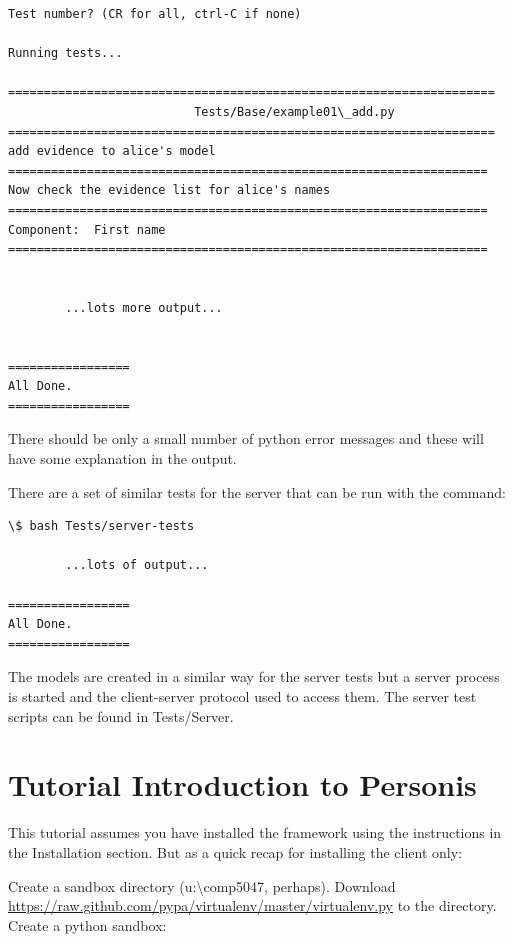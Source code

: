 \documentclass[letterpaper,10pt,english]{sphinxmanual}
\begin{document}
\begin{Verbatim}[commandchars=\\\{\}]
Test number? (CR for all, ctrl-C if none)

Running tests...

====================================================================
                          Tests/Base/example01\_add.py
====================================================================
add evidence to alice's model
===================================================================
Now check the evidence list for alice's names
===================================================================
Component:  First name
===================================================================


        ...lots more output...


=================
All Done.
=================
\end{Verbatim}

There should be only a small number of python error messages and these will have some explanation in the output.

There are a set of similar tests for the server that can be run with the command:

\begin{Verbatim}[commandchars=\\\{\}]
\$ bash Tests/server-tests

        ...lots of output...

=================
All Done.
=================
\end{Verbatim}

The models are created in a similar way for the server tests but a server process is started and the
client-server protocol used to access them. The server test scripts can be found in Tests/Server.


\chapter{Tutorial Introduction to Personis}
\label{Tutorial::doc}\label{Tutorial:tutorial-introduction-to-personis}
This tutorial assumes you have installed the framework using the instructions in the Installation section.
But as a quick recap for installing the client only:

Create a sandbox directory (u:\textbackslash{}comp5047, perhaps). Download \href{https://raw.github.com/pypa/virtualenv/master/virtualenv.py}{https://raw.github.com/pypa/virtualenv/master/virtualenv.py} to the directory. Create a python sandbox:
\end{document}

